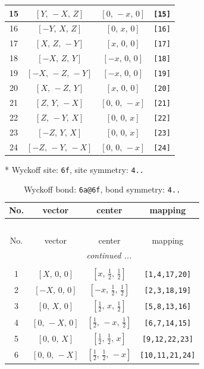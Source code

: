 \documentclass[fleqn,8pt]{jsarticle}
\begin{document}
\begin{longtable}{cccc}
15 & $\left[ Y,\, - X,\, Z \right]$ & $\left[ 0,\, - x,\, 0 \right]$ & {\tt [15]} \\ \hline
16 & $\left[ - Y,\, X,\, Z \right]$ & $\left[ 0,\, x,\, 0 \right]$ & {\tt [16]} \\ \hline
17 & $\left[ X,\, Z,\, - Y \right]$ & $\left[ x,\, 0,\, 0 \right]$ & {\tt [17]} \\ \hline
18 & $\left[ - X,\, Z,\, Y \right]$ & $\left[ - x,\, 0,\, 0 \right]$ & {\tt [18]} \\ \hline
19 & $\left[ - X,\, - Z,\, - Y \right]$ & $\left[ - x,\, 0,\, 0 \right]$ & {\tt [19]} \\ \hline
20 & $\left[ X,\, - Z,\, Y \right]$ & $\left[ x,\, 0,\, 0 \right]$ & {\tt [20]} \\ \hline
21 & $\left[ Z,\, Y,\, - X \right]$ & $\left[ 0,\, 0,\, - x \right]$ & {\tt [21]} \\ \hline
22 & $\left[ Z,\, - Y,\, X \right]$ & $\left[ 0,\, 0,\, x \right]$ & {\tt [22]} \\ \hline
23 & $\left[ - Z,\, Y,\, X \right]$ & $\left[ 0,\, 0,\, x \right]$ & {\tt [23]} \\ \hline
24 & $\left[ - Z,\, - Y,\, - X \right]$ & $\left[ 0,\, 0,\, - x \right]$ & {\tt [24]} \\
\end{longtable}
* Wyckoff site: {\tt 6f}, site symmetry: {\tt 4..}
\renewcommand{\arraystretch}{1.2}
\begin{longtable}{cccc}
\caption{Wyckoff bond: {\tt 6a@6f}, bond symmetry: {\tt 4..}}
 \\
 \hline \hline
No. & vector & center & mapping \\ \hline \endfirsthead

\multicolumn{3}{l}{\tablename\ \thetable{}} \\
 \hline \hline
No. & vector & center & mapping \\ \hline \endhead

 \hline \hline
\multicolumn{3}{r}{\footnotesize\it continued ...} \\ \endfoot

 \hline \hline
\multicolumn{3}{r}{} \\ \endlastfoot

1 & $\left[ X,\, 0,\, 0 \right]$ & $\left[ x,\, \frac{1}{2},\, \frac{1}{2} \right]$ & {\tt [1,4,17,20]} \\ \hline
2 & $\left[ - X,\, 0,\, 0 \right]$ & $\left[ - x,\, \frac{1}{2},\, \frac{1}{2} \right]$ & {\tt [2,3,18,19]} \\ \hline
3 & $\left[ 0,\, X,\, 0 \right]$ & $\left[ \frac{1}{2},\, x,\, \frac{1}{2} \right]$ & {\tt [5,8,13,16]} \\ \hline
4 & $\left[ 0,\, - X,\, 0 \right]$ & $\left[ \frac{1}{2},\, - x,\, \frac{1}{2} \right]$ & {\tt [6,7,14,15]} \\ \hline
5 & $\left[ 0,\, 0,\, X \right]$ & $\left[ \frac{1}{2},\, \frac{1}{2},\, x \right]$ & {\tt [9,12,22,23]} \\ \hline
6 & $\left[ 0,\, 0,\, - X \right]$ & $\left[ \frac{1}{2},\, \frac{1}{2},\, - x \right]$ & {\tt [10,11,21,24]} \\
\end{longtable}
\end{document}

